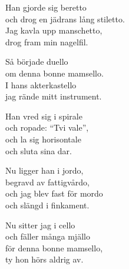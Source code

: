 \vspace{7pt}
Han gjorde sig beretto\\
och drog en jädrans lång stiletto.\\
Jag kavla upp manschetto,\\
drog fram min nagelfil.\par
\vspace{7pt}
Så började duello\\
om denna bonne mamsello.\\
I hans akterkastello\\
jag rände mitt instrument.\par
\vspace{7pt}
Han vred sig i spirale\\
och ropade: ``Tvi vale'',\\
och la sig horisontale\\
och sluta sina dar.\par
\vspace{7pt}
Nu ligger han i jordo,\\
begravd av fattigvårdo,\\
och jag blev fast för mordo\\
och slängd i finkament.\par
\vspace{7pt}
Nu sitter jag i cello\\
och fäller många mjällo\\
för denna bonne mamsello,\\
ty hon hörs aldrig av.

